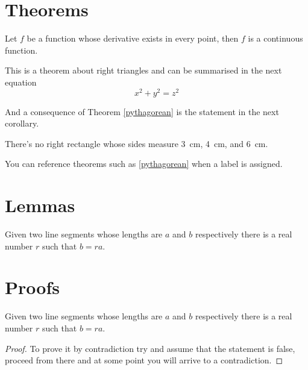 \blindtext

\section{Theorems}

\begin{theorem}
	Let \(f\) be a function whose derivative exists in every point, then \(f\) is 
	a continuous function.
\end{theorem}

\begin{theorem}
	\label{pythagorean}
	This is a theorem about right triangles and can be summarised in the next 
	equation 
	\[ x^2 + y^2 = z^2 \]
\end{theorem}

And a consequence of Theorem \ref{pythagorean} is the statement in the next corollary.

\begin{corollary}
	There's no right rectangle whose sides measure 3~cm, 4~cm, and 6~cm.
\end{corollary}

You can reference theorems such as \ref{pythagorean} when a label is assigned.

\blindtext

\section{Lemmas}

\begin{lemma}
	Given two line segments whose lengths are \(a\) and \(b\) respectively there is a 
	real number \(r\) such that \(b=ra\).
\end{lemma}

\blindtext

\section{Proofs}

\begin{lemma}
	Given two line segments whose lengths are \(a\) and \(b\) respectively there 
	is a real number \(r\) such that \(b=ra\).
\end{lemma}

\begin{proof}
	To prove it by contradiction try and assume that the statement is false,
	proceed from there and at some point you will arrive to a contradiction.
\end{proof}

